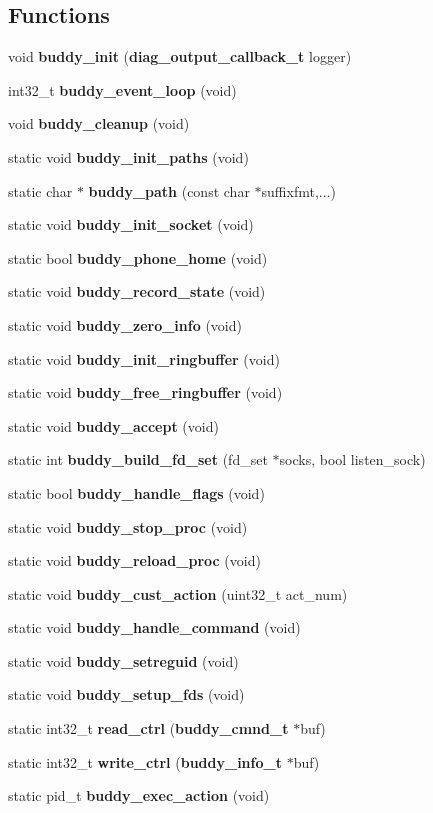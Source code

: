 \subsection*{Functions}
\begin{DoxyCompactItemize}
\item 
void {\bf buddy\_\-init} ({\bf diag\_\-output\_\-callback\_\-t} logger)
\item 
int32\_\-t {\bf buddy\_\-event\_\-loop} (void)
\item 
void {\bf buddy\_\-cleanup} (void)
\item 
static void {\bf buddy\_\-init\_\-paths} (void)
\item 
static char $\ast$ {\bf buddy\_\-path} (const char $\ast$suffixfmt,...)
\item 
static void {\bf buddy\_\-init\_\-socket} (void)
\item 
static bool {\bf buddy\_\-phone\_\-home} (void)
\item 
static void {\bf buddy\_\-record\_\-state} (void)
\item 
static void {\bf buddy\_\-zero\_\-info} (void)
\item 
static void {\bf buddy\_\-init\_\-ringbuffer} (void)
\item 
static void {\bf buddy\_\-free\_\-ringbuffer} (void)
\item 
static void {\bf buddy\_\-accept} (void)
\item 
static int {\bf buddy\_\-build\_\-fd\_\-set} (fd\_\-set $\ast$socks, bool listen\_\-sock)
\item 
static bool {\bf buddy\_\-handle\_\-flags} (void)
\item 
static void {\bf buddy\_\-stop\_\-proc} (void)
\item 
static void {\bf buddy\_\-reload\_\-proc} (void)
\item 
static void {\bf buddy\_\-cust\_\-action} (uint32\_\-t act\_\-num)
\item 
static void {\bf buddy\_\-handle\_\-command} (void)
\item 
static void {\bf buddy\_\-setreguid} (void)
\item 
static void {\bf buddy\_\-setup\_\-fds} (void)
\item 
static int32\_\-t {\bf read\_\-ctrl} ({\bf buddy\_\-cmnd\_\-t} $\ast$buf)
\item 
static int32\_\-t {\bf write\_\-ctrl} ({\bf buddy\_\-info\_\-t} $\ast$buf)
\item 
static pid\_\-t {\bf buddy\_\-exec\_\-action} (void)
\item 

\end{DoxyCompactItemize}
